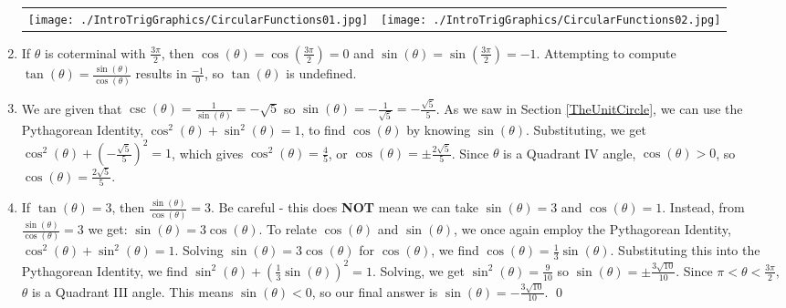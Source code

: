 \begin{ex}
\begin{enumerate}
\begin{tabular}{cc}

\texttt{[image: ./IntroTrigGraphics/CircularFunctions01.jpg]} &
\hspace{0.75in} \texttt{[image: ./IntroTrigGraphics/CircularFunctions02.jpg]}  \\ 

\end{tabular} 

\item  If $\theta$ is coterminal with $\frac{3 \pi}{2}$, then $\cos(\theta) = \cos\left(\frac{3 \pi}{2}\right) = 0$ and $\sin(\theta) = \sin\left(\frac{3 \pi}{2}\right) = -1$.  Attempting to compute $\tan(\theta) = \frac{\sin(\theta)}{\cos(\theta)}$ results in $\frac{-1}{0}$, so $\tan(\theta)$ is undefined.

\item  We are given that $\csc(\theta) = \frac{1}{\sin(\theta)} = -\sqrt{5}$ so $\sin(\theta) = -\frac{1}{\sqrt{5}} = -\frac{\sqrt{5}}{5}$.  As we saw in Section \ref{TheUnitCircle}, we can use the Pythagorean Identity, $\cos^{2}(\theta) + \sin^2(\theta) = 1$, to find $\cos(\theta)$ by knowing $\sin(\theta)$.  Substituting, we get $\cos^{2}(\theta) + \left(-\frac{\sqrt{5}}{5}\right)^2 = 1$, which gives $\cos^{2}(\theta) = \frac{4}{5}$, or $\cos(\theta) = \pm \frac{2 \sqrt{5}}{5}$.  Since $\theta$ is a Quadrant IV angle, $\cos(\theta) > 0$, so $\cos(\theta) = \frac{2 \sqrt{5}}{5}$.

\item \label{commontanmistake} If $\tan(\theta) = 3$, then $\frac{\sin(\theta)}{\cos(\theta)} = 3$.  Be careful - this does \textbf{NOT} mean we can take $\sin(\theta) = 3$ and $\cos(\theta) = 1$. Instead, from $\frac{\sin(\theta)}{\cos(\theta)} = 3$  we get: $\sin(\theta) = 3 \cos(\theta)$.  To relate $\cos(\theta)$ and $\sin(\theta)$, we once again employ the Pythagorean Identity, $\cos^{2}(\theta) + \sin^{2}(\theta) = 1$.  Solving $\sin(\theta) = 3 \cos(\theta)$ for $\cos(\theta)$, we find $\cos(\theta) = \frac{1}{3} \sin(\theta)$.  Substituting this into the Pythagorean Identity, we find  $\sin^{2}(\theta) + \left(\frac{1}{3} \sin(\theta)\right)^2 = 1$. Solving, we get $\sin^{2}(\theta) = \frac{9}{10}$ so $\sin(\theta) = \pm \frac{3 \sqrt{10}}{10}$.  Since $\pi < \theta < \frac{3\pi}{2}$, $\theta$ is  a Quadrant III angle.  This means $\sin(\theta) < 0$, so our final answer is  $\sin(\theta) = - \frac{3 \sqrt{10}}{10}$.  \qed

\end{enumerate}

\end{ex}


